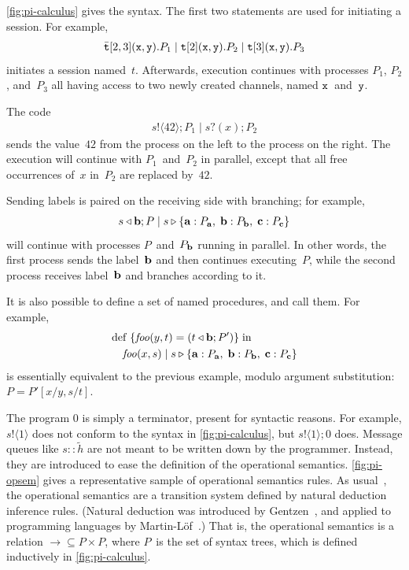 \documentclass[a4paper,12pt,oneside,fleqn]{book} %
\begin{document}
\autoref{fig:pi-calculus} gives the syntax.
The first two statements are used for initiating a session.
For example,
\begin{align}
  \bar{{\tt t}}[2,3]({\tt x},{\tt y}).P_1
  \mid
  {\tt t}[2]({\tt x},{\tt y}).P_2
  \mid
  {\tt t}[3]({\tt x},{\tt y}).P_3
\end{align}
initiates a session named~$t$.
Afterwards,
  execution continues with processes $P_1$, $P_2$, and~$P_3$
  all having access to two newly created channels,
    named ${\tt x}$~and~${\tt y}$.

The code
\begin{align}
  s! \langle 42 \rangle; P_1
  \mid
  s? (x); P_2
\end{align}
sends the value~$42$ from the process on the left to the process on the
right. The execution will continue with $P_1$~and~$P_2$ in parallel, except
that all free occurrences of~$x$ in~$P_2$ are replaced by~$42$.

Sending labels is paired on the receiving side with branching;
  for example,
\begin{align}
  s \triangleleft {\bf b}; P
  \mid
  s \triangleright
    \{ {\bf a} : P_{\bf a},\;
       {\bf b} : P_{\bf b},\;
       {\bf c} : P_{\bf c} \}
\end{align}
will continue with processes $P$~and~$P_{\bf b}$ running in parallel.
In other words,
  the first process sends the label~$\bf b$ and then continues executing~$P$,
  while the second process receives label~$\bf b$ and branches according to it.

It is also possible to define a set of named procedures, and call them.
For example,
\begin{align}
\begin{aligned}
  &{\rm def}\;\{{\it foo}(y,t)=(t\triangleleft{\bf b}; P')\}\;{\rm in} \\
  &\quad {\it foo}(x,s)
    \mid
    s \triangleright
    \{ {\bf a} : P_{\bf a},\;
       {\bf b} : P_{\bf b},\;
       {\bf c} : P_{\bf c} \}
\end{aligned}
  \label{eq:ex-mast-send-label}
\end{align}
is essentially equivalent to the previous example,
  modulo argument substitution: $P=P'[x/y,s/t]$.

The program $0$ is simply a terminator,
  present for syntactic reasons.
For example,
  $s!\langle1\rangle$ does not conform to the syntax in
    \autoref{fig:pi-calculus},
  but $s!\langle1\rangle;0$ does.
Message queues like $s::\tilde{h}$
  are not meant to be written down by the programmer.
Instead,
  they are introduced to ease the definition of the operational semantics.
\autoref{fig:pi-opsem} gives
  a representative sample of operational semantics rules.
As usual~\cite[Chapter~5]{harper2012},
  the operational semantics are a transition system
    defined by natural deduction inference rules.
(Natural deduction was introduced by Gentzen~\cite{gentzen1969},
  and applied to programming languages by Martin-L\"of~\cite{martinlof1980}.)
That is, the operational semantics is a relation
  ${\to} \subseteq P \times P$,
  where $P$~is the set of syntax trees,
    which is defined inductively in \autoref{fig:pi-calculus}.
\end{document}

